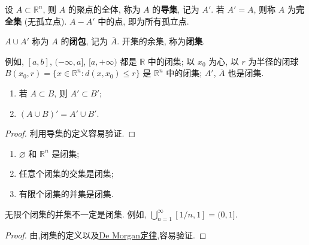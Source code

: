 \documentclass[../../main.tex]{subfiles}
\begin{document}
\begin{definition}
设 $A \subset \mathbb{R}^n$, 则 $A$ 的聚点的全体, 称为 $A$ 的\textbf{导集}, 记为 $A'$. 若 $A' = A$, 则称 $A$ 为\textbf{完全集} (无孤立点).
$A - A'$ 中的点, 即为所有孤立点.

$A \cup A'$ 称为 $A$ 的\textbf{闭包}, 记为 $\overline{A}$.
开集的余集, 称为\textbf{闭集}.
\end{definition}
\begin{note}
例如, $[a, b]$, $(-\infty, a]$, $[a, +\infty)$ 都是 $\mathbb{R}$ 中的闭集; 以 $x_0$ 为心, 以 $r$ 为半径的闭球 $B(x_0, r) = \{x \in \mathbb{R}^n : d(x, x_0) \leqslant r\}$ 是 $\mathbb{R}^n$ 中的闭集; $A'$, $\overline{A}$ 也是闭集.
\end{note}

\begin{proposition}
\begin{enumerate}[(1)]
\item 若 $A \subset B$, 则 $A' \subset B'$;
\item $(A \cup B)' = A' \cup B'$.
\end{enumerate}
\end{proposition}
\begin{proof}
利用导集的定义容易验证.

\end{proof}

\begin{proposition}[闭集的性质]\label{proposition:闭集的性质}
\begin{enumerate}[(1)]
\item $\varnothing$ 和 $\mathbb{R}^n$ 是闭集;
\item 任意个闭集的交集是闭集;
\item 有限个闭集的并集是闭集.
\end{enumerate}
\end{proposition}
\begin{remark}
无限个闭集的并集不一定是闭集. 例如, $\bigcup_{n = 1}^{\infty} [1/n, 1] = (0, 1]$.
\end{remark}
\begin{proof}
由,闭集的定义以及\hyperref[Set Theory-theorem:De Morgan定律]{De Morgan定律},容易验证.

\end{proof}
\end{document}
